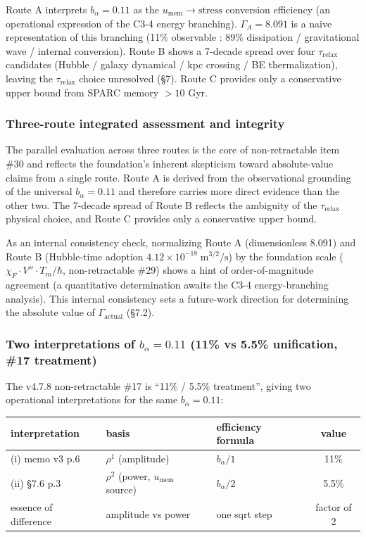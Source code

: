 \documentclass[11pt,a4paper]{article}
\newcommand{\Tm}{T_{m}}
\newcommand{\taur}{\tau_{\mathrm{relax}}}
\newcommand{\bal}{b_{\alpha}}
\newcommand{\umem}{u_{\mathrm{mem}}}
\newcommand{\GammaA}{\Gamma_{A}}
\newcommand{\Gammaact}{\Gamma_{\mathrm{actual}}}
\begin{document}
Route A interprets $\bal = 0.11$ as the $\umem \to \text{stress}$ conversion efficiency
(an operational expression of the C3-4 energy branching). $\GammaA = 8.091$ is a naive
representation of this branching (11\% observable : 89\% dissipation / gravitational wave /
internal conversion). Route B shows a 7-decade spread over four $\taur$ candidates
(Hubble / galaxy dynamical / kpc crossing / BE thermalization), leaving the $\taur$ choice
unresolved (\S 7). Route C provides only a conservative upper bound from SPARC memory $> 10$ Gyr.

\subsubsection{Three-route integrated assessment and integrity}
The parallel evaluation across three routes is the core of non-retractable item \#30 and reflects
the foundation's inherent skepticism toward absolute-value claims from a single route. Route A is
derived from the observational grounding of the universal $\bal = 0.11$ and therefore carries more
direct evidence than the other two. The 7-decade spread of Route B reflects the ambiguity of the
$\taur$ physical choice, and Route C provides only a conservative upper bound.

As an internal consistency check, normalizing Route A (dimensionless 8.091) and Route B (Hubble-time
adoption $4.12 \times 10^{-18}\;\mathrm{m}^{3/2}/\mathrm{s}$) by the foundation scale
($\chi_F \cdot V'' \cdot \Tm / \hbar$, non-retractable \#29) shows a hint of order-of-magnitude
agreement (a quantitative determination awaits the C3-4 energy-branching analysis). This internal
consistency sets a future-work direction for determining the absolute value of $\Gammaact$
(\S 7.2).

\subsubsection{\texorpdfstring{Two interpretations of $\bal = 0.11$ (11\% vs 5.5\% unification, \#17 treatment)}{Two interpretations of b\_alpha = 0.11}}
The v4.7.8 non-retractable \#17 is ``11\% / 5.5\% treatment'', giving two operational interpretations
for the same $\bal = 0.11$:

\begin{center}\small
\begin{tabular}{@{}lllc@{}}
\toprule
interpretation & basis & efficiency formula & value \\
\midrule
(i) memo v3 p.6 & $\rho^{1}$ (amplitude) & $\bal / 1$ & 11\% \\
(ii) \S 7.6 p.3 & $\rho^{2}$ (power, $\umem$ source) & $\bal / 2$ & 5.5\% \\
\midrule
essence of difference & amplitude vs power & one sqrt step & factor of 2 \\
\bottomrule
\end{tabular}
\end{center}
\end{document}
